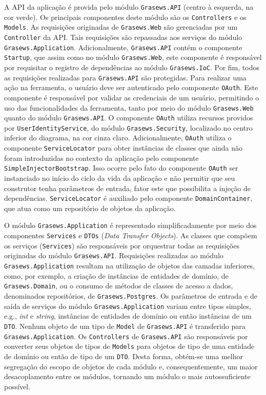A API da aplicação é provida pelo módulo \texttt{Grasews.API} (centro à esquerda, na cor verde). Os principais componentes deste módulo são os \texttt{Controllers} e os \texttt{Models}. As requisições originadas de \texttt{Grasews.Web} são gerenciadas por um \texttt{Controller} da API. Tais requisições são repassadas aos serviços do módulo \texttt{Grasews.Application}. Adicionalmente, \texttt{Grasews.API} contém o componente \texttt{Startup}, que assim como no módulo \texttt{Grasews.Web}, este componente é responsável por requisitar o registro de dependências ao módulo \texttt{Grasews.IoC}. Por fim, todos as requisições realizadas para \texttt{Grasews.API} são protegidas. Para realizar uma ação na ferramenta, o usuário deve ser autenticado pelo componente \texttt{OAuth}. Este componente é responsável por validar as credenciais de um usuário, permitindo o uso das funcionalidades da ferramenta, tanto por meio do módulo \texttt{Grasews.Web} quanto do módulo \texttt{Grasews.API}. O componente \texttt{OAuth} utiliza recursos providos por \texttt{UserIdentityService}, do módulo \texttt{Grasews.Security}, localizado no centro inferior do diagrama, na cor cinza claro. Adicionalmente, \texttt{OAuth} utiliza o componente \texttt{ServiceLocator} para obter instâncias de classes que ainda não foram introduzidas no contexto da aplicação pelo componente \texttt{SimpleInjectorBootstrap}. Isso ocorre pelo fato do componente \texttt{OAuth} ser instanciado no início do ciclo da vida da aplicação e não permitir que seu construtor tenha parâmetros de entrada, fator este que possibilita a injeção de dependências. \texttt{ServiceLocator} é auxiliado pelo componente \texttt{DomainContainer}, que atua como um repositório de objetos da aplicação.

O módulo \texttt{Grasews.Application} é representado simplificadamente por meio dos componentes \texttt{Services} e \texttt{DTOs} (\textit{Data Transfer Objects}). As classes que compõem os serviços (\texttt{Services}) são responsáveis por orquestrar todas as requisições originadas do módulo \texttt{Grasews.API}. Requisições realizadas ao módulo \texttt{Grasews.Application} resultam na utilização de objetos das camadas inferiores, como, por exemplo, a criação de instâncias de entidades de domínio, de \texttt{Grasews.Domain}, ou o consumo de métodos de classes de acesso a dados, denominados repositórios, de \texttt{Grasews.Postgres}. Os parâmetros de entrada e de saída de serviços do módulo \texttt{Grasews.Application} variam entre tipos simples, e.g., \textit{int} e \textit{string}, instâncias de entidades de domínio ou então instâncias de um \texttt{DTO}. Nenhum objeto de um tipo de \texttt{Model} de \texttt{Grasews.API} é transferido para \texttt{Grasews.Application}. Os \texttt{Controllers} de \texttt{Grasews.API} são responsáveis por converter seus objetos de tipos de  \texttt{Models} para objetos de tipo de uma entidade de domínio ou então de tipo de um \texttt{DTO}. Desta forma, obtém-se uma melhor segregação do escopo de objetos de cada módulo e, consequentemente, um maior desacoplamento entre os módulos, tornando um módulo o mais autossuficiente possível.


